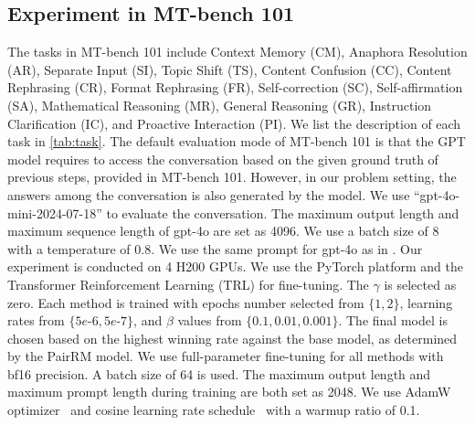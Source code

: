 \subsection{Experiment in MT-bench 101}
\label{sec:appendix_exp}
The tasks in MT-bench 101 include 
Context Memory (CM), Anaphora Resolution (AR), Separate Input (SI), Topic Shift (TS), Content Confusion (CC), Content Rephrasing (CR), Format Rephrasing (FR), Self-correction (SC), Self-affirmation (SA), Mathematical Reasoning (MR), General Reasoning (GR), Instruction Clarification (IC), and Proactive Interaction (PI). We list the description of each task in \cref{tab:task}. The default evaluation mode of MT-bench 101 is that the GPT model requires to access the conversation based on the given ground truth of previous steps, provided in MT-bench 101. However, in our problem setting, the answers among the conversation is also generated by the model. We use ``gpt-4o-mini-2024-07-18'' to evaluate the conversation.
The maximum output length and maximum sequence length of gpt-4o are set as 4096. We use a batch size of 8 with a temperature of 0.8. We use the same prompt for gpt-4o as in \citet{bai2024mt}. Our experiment is conducted on 4 H200 GPUs. We use the PyTorch platform and the Transformer Reinforcement Learning (TRL) for fine-tuning. The $\gamma$ is selected as zero. Each method is trained with epochs number selected from $ \{1, 2\} $, learning rates from $\{5e\text{-}6, 5e\text{-}7\} $, and $\beta$ values from $ \{0.1, 0.01, 0.001\}$. The final model is chosen based on the highest winning rate against the base model, as determined by the PairRM model. We use full-parameter fine-tuning for all methods with bf16 precision. A batch size of 64 is used. The maximum output length and maximum prompt length during training are both set as 2048. We use AdamW optimizer~\citep{loshchilov2018decoupled} and cosine learning rate schedule~\citep{loshchilov2017sgdr} with a warmup ratio of 0.1.
